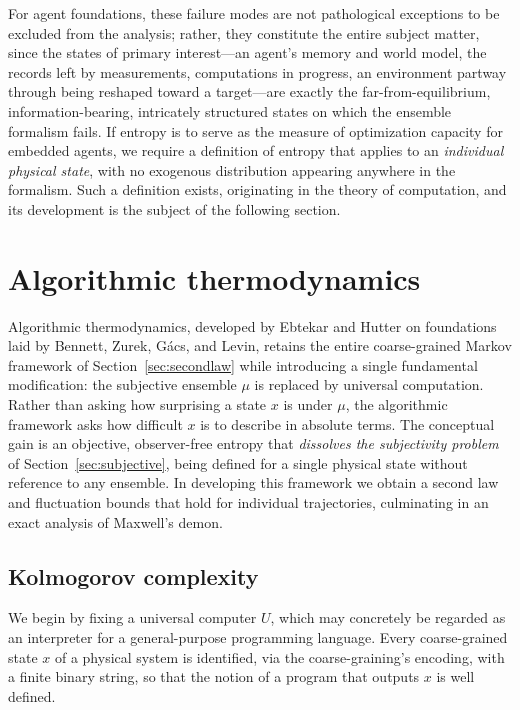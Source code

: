 \documentclass[11pt]{article}
\begin{document}
For agent foundations, these failure modes are not pathological exceptions to be excluded from the analysis; rather, they constitute the entire subject matter, since the states of primary interest---an agent's memory and world model, the records left by measurements, computations in progress, an environment partway through being reshaped toward a target---are exactly the far-from-equilibrium, information-bearing, intricately structured states on which the ensemble formalism fails. If entropy is to serve as the measure of optimization capacity for embedded agents, we require a definition of entropy that applies to an \emph{individual physical state}, with no exogenous distribution appearing anywhere in the formalism. Such a definition exists, originating in the theory of computation, and its development is the subject of the following section.
\section{Algorithmic thermodynamics}
\label{sec:algo}

Algorithmic thermodynamics, developed by Ebtekar and Hutter on foundations laid by Bennett, Zurek, G\'acs, and Levin, retains the entire coarse-grained Markov framework of Section~\ref{sec:secondlaw} while introducing a single fundamental modification: the subjective ensemble $\mu$ is replaced by universal computation. Rather than asking how surprising a state $x$ is under $\mu$, the algorithmic framework asks how difficult $x$ is to describe in absolute terms. The conceptual gain is an objective, observer-free entropy that \emph{dissolves the subjectivity problem} of Section~\ref{sec:subjective}, being defined for a single physical state without reference to any ensemble. In developing this framework we obtain a second law and fluctuation bounds that hold for individual trajectories, culminating in an exact analysis of Maxwell's demon.

\subsection{Kolmogorov complexity}
\label{sec:kolmogorov}

We begin by fixing a universal computer $U$, which may concretely be regarded as an interpreter for a general-purpose programming language. Every coarse-grained state $x$ of a physical system is identified, via the coarse-graining's encoding, with a finite binary string, so that the notion of a program that outputs $x$ is well defined.
\end{document}
